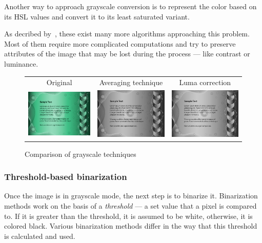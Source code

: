 Another way to approach grayscale conversion is to represent the color based on its HSL values and convert it to its least saturated variant.

As decribed by~\citet{grayscaleCadik}, these exist many more algorithms approaching this problem. Most of them require more complicated computations and try to preserve attributes of the image that may be lost during the process --- like contrast or luminance.

\begin{figure}[t]
\centering
{\sffamily
\begin{tabular}{ccc}
Original & Averaging technique & Luma correction \\
\includegraphics[width=.28\linewidth]{img/preprocessing/grayscale_orig.jpg}
&
\includegraphics[width=.28\linewidth]{img/preprocessing/grayscale_avg.png}
&
\includegraphics[width=.28\linewidth]{img/preprocessing/grayscale_luma.png}
\end{tabular}
}
\caption{Comparison of grayscale techniques}
\label{fig:preprocessGrayscale}
\end{figure}

\subsubsection{Threshold-based binarization}
Once the image is in grayscale mode, the next step is to binarize it. Binarization methods work on the basis of a \emph{threshold} --- a set value that a pixel is compared to. If it is greater than the threshold, it is assumed to be white, otherwise, it is colored black. Various binarization methods differ in the way that this threshold is calculated and used.

